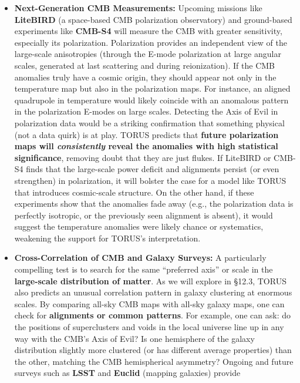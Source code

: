 \documentclass[
]{article}
\begin{document}
{\begin{itemize}
\item
  \textbf{Next-Generation CMB Measurements:} Upcoming missions like
  \textbf{LiteBIRD} (a space-based CMB polarization observatory) and
  ground-based experiments like \textbf{CMB-S4} will measure the CMB
  with greater sensitivity, especially its polarization. Polarization
  provides an independent view of the large-scale anisotropies (through
  the E-mode polarization at large angular scales, generated at last
  scattering and during reionization). If the CMB anomalies truly have a
  cosmic origin, they should appear not only in the temperature map but
  also in the polarization maps. For instance, an aligned quadrupole in
  temperature would likely coincide with an anomalous pattern in the
  polarization E-modes on large scales. Detecting the Axis of Evil in
  polarization data would be a striking confirmation that something
  physical (not a data quirk) is at play. TORUS predicts that
  \textbf{future polarization maps will \emph{consistently} reveal the
  anomalies with high statistical significance}, removing doubt that
  they are just flukes\hspace{0pt}. If LiteBIRD or CMB-S4 finds that the
  large-scale power deficit and alignments persist (or even strengthen)
  in polarization, it will bolster the case for a model like TORUS that
  introduces cosmic-scale structure. On the other hand, if these
  experiments show that the anomalies fade away (e.g., the polarization
  data is perfectly isotropic, or the previously seen alignment is
  absent), it would suggest the temperature anomalies were likely chance
  or systematics, weakening the support for TORUS's interpretation.
\item
  \textbf{Cross-Correlation of CMB and Galaxy Surveys:} A particularly
  compelling test is to search for the same ``preferred axis'' or scale
  in the \textbf{large-scale distribution of matter}. As we will explore
  in §12.3, TORUS also predicts an unusual correlation pattern in galaxy
  clustering at enormous scales. By comparing all-sky CMB maps with
  all-sky galaxy maps, one can check for \textbf{alignments or common
  patterns}. For example, one can ask: do the positions of superclusters
  and voids in the local universe line up in any way with the CMB's Axis
  of Evil? Is one hemisphere of the galaxy distribution slightly more
  clustered (or has different average properties) than the other,
  matching the CMB hemispherical asymmetry? Ongoing and future surveys
  such as \textbf{LSST} and \textbf{Euclid} (mapping galaxies) provide

\end{itemize}}
\end{document}
